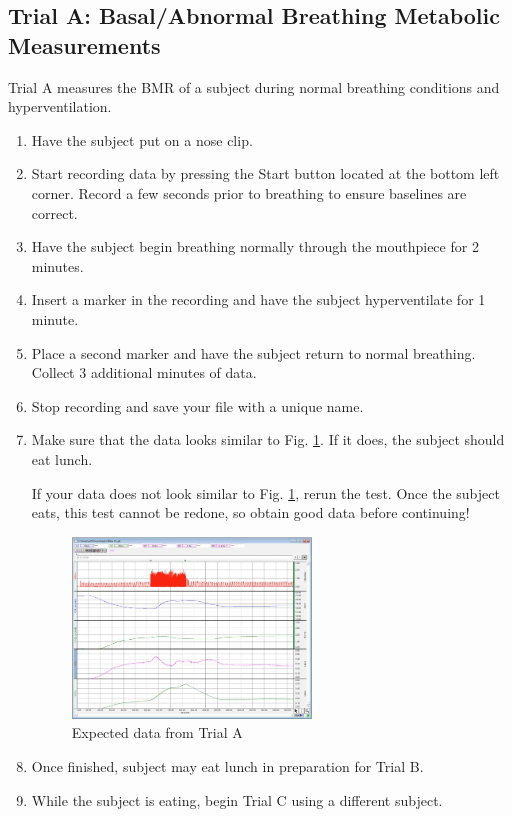 \documentclass{article}
\begin{document}
\subsection*{Trial A: Basal/Abnormal Breathing Metabolic Measurements}
Trial A measures the BMR of a subject during normal breathing conditions and hyperventilation.
\begin{enumerate}
	\item Have the subject put on a nose clip.
	\item Start recording data by pressing the Start button located at the bottom left corner. Record a few seconds prior to breathing to ensure baselines are correct.
	\item Have the subject begin breathing normally through the mouthpiece for 2 minutes.
	\item Insert a marker in the recording and have the subject hyperventilate for 1 minute.
	\item Place a second marker and have the subject return to normal breathing. Collect 3 additional minutes of data.
	\item Stop recording and save your file with a unique name.
	\item Make sure that the data looks similar to Fig. \ref{baseline}. If it does, the subject should eat lunch.
	\begin{warn}
		If your data does not look similar to Fig. \ref{baseline}, rerun the test. Once the subject eats, this test cannot be redone, so obtain good data before continuing!
	\end{warn}
	
	\begin{figure}[h]
	\centering\includegraphics[width=0.6\textwidth]{../images/BMR_7.jpg}
		\caption{Expected data from Trial A}
		\label{baseline}
		\end{figure}

	\item Once finished, subject may eat lunch in preparation for Trial B.
	\item While the subject is eating, begin Trial C using a different subject.
\end{enumerate}
\end{document}
